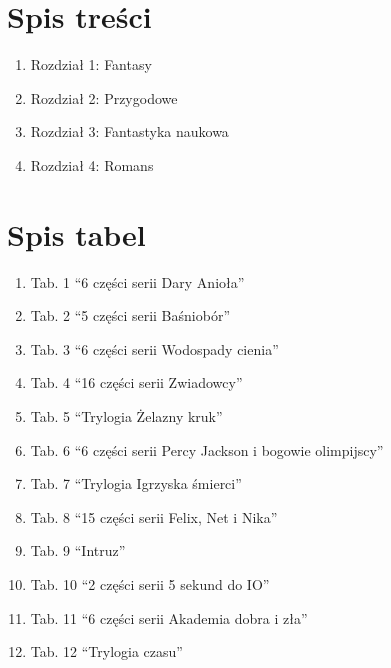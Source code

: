 \documentclass{article}
\begin{document}
\section{Spis treści}
\begin{enumerate}
    \item Rozdział 1: Fantasy

    \item Rozdział 2: Przygodowe

    \item Rozdział 3: Fantastyka naukowa
	
	\item Rozdział 4: Romans

\end{enumerate}

\section{Spis tabel}
\begin{enumerate}
    \item Tab. 1 “6 części serii Dary Anioła”

    \item Tab. 2 “5 części serii Baśniobór”

    \item Tab. 3 “6 części serii Wodospady cienia”
	
	\item Tab. 4 “16 części serii Zwiadowcy”
	
	\item Tab. 5 “Trylogia Żelazny kruk”
	
    \item Tab. 6 “6 części serii Percy Jackson i bogowie olimpijscy”

    \item Tab. 7 “Trylogia Igrzyska śmierci”
	
	\item Tab. 8 “15 części serii Felix, Net i Nika”
	
	\item Tab. 9 “Intruz”

    \item Tab. 10 “2 części serii 5 sekund do IO”

    \item Tab. 11 “6 części serii Akademia dobra i zła”
	
	\item Tab. 12 “Trylogia czasu”

\end{enumerate}
\end{document}
